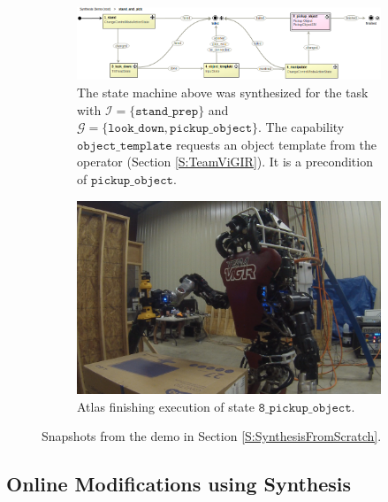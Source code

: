 \begin{figure}[t]
	\centering
	\begin{subfigure}[b]{0.99\columnwidth}
	\includegraphics[width=0.99\columnwidth,clip]{./img/stand_and_pick_sm.png}
	\caption{
	The state machine above was synthesized for the task with $\mathcal{I} = \{ \mathtt{stand\_prep} \}$ and $\mathcal{G} = \{ \mathtt{look\_down}, \mathtt{pickup\_object} \}$.
	The capability $\mathtt{object\_template}$ requests an object template from the operator (Section \ref{S:TeamViGIR}).
	It is a precondition of $\mathtt{pickup\_object}$.
	}
	\label{Fig:stand_and_pick_sm}
	\end{subfigure}
	
	\vspace{4 pt}
	\begin{subfigure}[b]{0.95\columnwidth}
	\includegraphics[width=0.99\columnwidth, clip]{./img/stand_and_pick_gopro.png}
	\caption{Atlas finishing execution of state $\mathtt{8\_pickup\_object}$.
	} 
	\label{Fig:stand_and_pick_gopro}
	\end{subfigure}
	\caption{
	Snapshots from the demo in Section \ref{S:SynthesisFromScratch}.
	}
	\label{Fig:stand_and_pick_demo}
\end{figure}

\subsection{Online Modifications using Synthesis}\label{S:RuntimeSynthesis}

